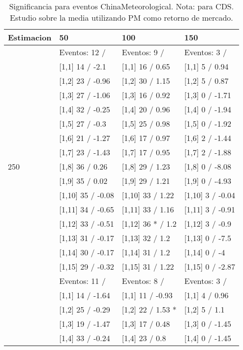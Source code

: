 \begin{table}

\caption{Significancia para eventos ChinaMeteorological. Nota: para CDS. Estudio sobre la media utilizando PM como retorno de mercado.}
\centering
\begin{tabular}[t]{llll}
\toprule
Estimacion & 50 & 100 & 150\\
\midrule
 & Eventos:  12 / & Eventos:  9 / & Eventos:  3 /\\
 & {}[1,1] 14  / -2.1 & {}[1,1] 16  / 0.65 & {}[1,1] 5  / 0.94\\
 & {}[1,2] 23  / -0.96 & {}[1,2] 30  / 1.15 & {}[1,2] 5  / 0.87\\
 & {}[1,3] 27  / -1.06 & {}[1,3] 16  / 0.92 & {}[1,3] 0  / -1.71\\
 & {}[1,4] 32  / -0.25 & {}[1,4] 20  / 0.96 & {}[1,4] 0  / -1.94\\
\addlinespace
 & {}[1,5] 27  / -0.3 & {}[1,5] 25  / 0.98 & {}[1,5] 0  / -1.92\\
 & {}[1,6] 21  / -1.27 & {}[1,6] 17  / 0.97 & {}[1,6] 2  / -1.44\\
 & {}[1,7] 23  / -1.43 & {}[1,7] 17  / 0.95 & {}[1,7] 2  / -1.88\\
250 & {}[1,8] 36  / 0.26 & {}[1,8] 29  / 1.23 & {}[1,8] 0  / -8.08\\
 & {}[1,9] 35  / 0.02 & {}[1,9] 29  / 1.21 & {}[1,9] 0  / -4.93\\
\addlinespace
 & {}[1,10] 35  / -0.08 & {}[1,10] 33  / 1.22 & {}[1,10] 3  / -0.04\\
 & {}[1,11] 34  / -0.65 & {}[1,11] 33  / 1.16 & {}[1,11] 3  / -0.91\\
 & {}[1,12] 33  / -0.51 & {}[1,12] 36 * / 1.2 & {}[1,12] 3  / -0.9\\
 & {}[1,13] 31  / -0.17 & {}[1,13] 32  / 1.2 & {}[1,13] 0  / -7.5\\
 & {}[1,14] 30  / -0.17 & {}[1,14] 31  / 1.2 & {}[1,14] 0  / -4\\
\addlinespace
 & {}[1,15] 29  / -0.32 & {}[1,15] 31  / 1.22 & {}[1,15] 0  / -2.87\\
 & Eventos:  11 / & Eventos:  8 / & Eventos:  3 /\\
 & {}[1,1] 14  / -1.64 & {}[1,1] 11  / -0.93 & {}[1,1] 4  / 0.96\\
 & {}[1,2] 25  / -0.29 & {}[1,2] 22  / 1.53 * & {}[1,2] 5  / 1.1\\
 & {}[1,3] 19  / -1.47 & {}[1,3] 17  / 0.48 & {}[1,3] 0  / -1.45\\
\addlinespace
 & {}[1,4] 33  / -0.24 & {}[1,4] 23  / 0.8 & {}[1,4] 0  / -1.45\\

\end{tabular}
\end{table}
